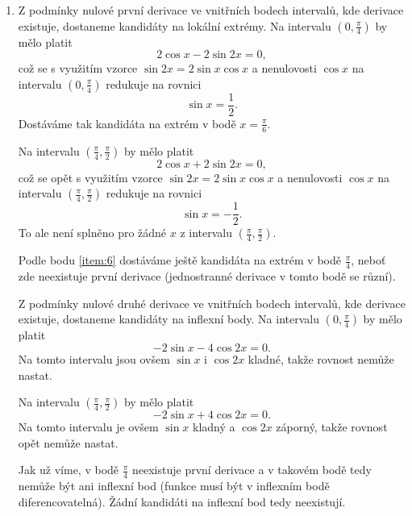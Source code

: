 \documentclass[answers]{exam}
\begin{document}
\begin{questions}
\begin{solution}
\begin{enumerate}
    		\item Z podmínky nulové první derivace ve vnitřních bodech intervalů, kde derivace existuje, dostaneme kandidáty na lokální extrémy. Na intervalu $(0, \frac{\pi}{4})$ by mělo platit
    		\begin{equation*}
    			2 \cos x - 2 \sin 2x = 0,
    		\end{equation*}
    		což se s využitím vzorce $\sin 2x = 2 \sin x \cos x$ a nenulovosti $\cos x$ na intervalu $(0, \frac{\pi}{4})$ redukuje na rovnici
    		\begin{equation*}
    			\sin x = \frac{1}{2}.
    		\end{equation*}
    		Dostáváme tak kandidáta na extrém v bodě $x = \frac{\pi}{6}$.
    		
    		Na intervalu $(\frac{\pi}{4}, \frac{\pi}{2})$ by mělo platit
    		\begin{equation*}
    			2 \cos x + 2 \sin 2x = 0,
    		\end{equation*}
    		což se opět s využitím vzorce $\sin 2x = 2 \sin x \cos x$ a nenulovosti $\cos x$ na intervalu $(\frac{\pi}{4}, \frac{\pi}{2})$ redukuje na rovnici
    		\begin{equation*}
    			\sin x = -\frac{1}{2}.
    		\end{equation*}    		
    		To ale není splněno pro žádné $x$ z intervalu $(\frac{\pi}{4}, \frac{\pi}{2})$.
    		
    		Podle bodu \ref{item:6} dostáváme ještě kandidáta na extrém v bodě $\frac{\pi}{4}$, neboť zde neexistuje první derivace (jednostranné derivace v tomto bodě se různí).
    		    		
    		Z podmínky nulové druhé derivace ve vnitřních bodech intervalů, kde derivace existuje, dostaneme kandidáty na inflexní body. Na intervalu $(0, \frac{\pi}{4})$ by mělo platit
    		\begin{equation*}
    			- 2 \sin x - 4 \cos 2x = 0.
    		\end{equation*}
    		Na tomto intervalu jsou ovšem $\sin x$ i $\cos 2x$ kladné, takže rovnost nemůže nastat.
    		
    		Na intervalu $(\frac{\pi}{4}, \frac{\pi}{2})$ by mělo platit
    		\begin{equation*}
    			- 2 \sin x + 4 \cos 2x = 0.
    		\end{equation*}
    		Na tomto intervalu je ovšem $\sin x$ kladný a $\cos 2x$ záporný, takže rovnost opět nemůže nastat.
    		
    		Jak už víme, v bodě $\frac{\pi}{4}$ neexistuje první derivace a v takovém bodě tedy nemůže být ani inflexní bod (funkce musí být v inflexním bodě diferencovatelná). Žádní kandidáti na inflexní bod tedy neexistují.
    		

\end{enumerate}
\end{solution}
\end{questions}
\end{document}
